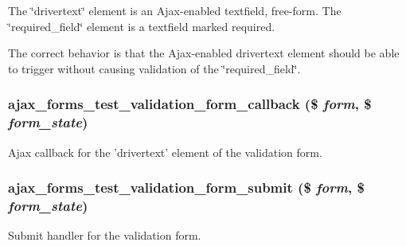The \char`\"{}drivertext\char`\"{} element is an Ajax-\/enabled textfield, free-\/form. The \char`\"{}required\_\-field\char`\"{} element is a textfield marked required.

The correct behavior is that the Ajax-\/enabled drivertext element should be able to trigger without causing validation of the \char`\"{}required\_\-field\char`\"{}. \hypertarget{ajax__forms__test_8module_a0f5790428359ee51c6949f4a93cb5387}{
\subsubsection[{ajax\_\-forms\_\-test\_\-validation\_\-form\_\-callback}]{\setlength{\rightskip}{0pt plus 5cm}ajax\_\-forms\_\-test\_\-validation\_\-form\_\-callback (\$ {\em form}, \/  \$ {\em form\_\-state})}}
\label{ajax__forms__test_8module_a0f5790428359ee51c6949f4a93cb5387}
Ajax callback for the 'drivertext' element of the validation form. \hypertarget{ajax__forms__test_8module_a85eb09134f35df5abd02870a263e0f32}{
\subsubsection[{ajax\_\-forms\_\-test\_\-validation\_\-form\_\-submit}]{\setlength{\rightskip}{0pt plus 5cm}ajax\_\-forms\_\-test\_\-validation\_\-form\_\-submit (\$ {\em form}, \/  \$ {\em form\_\-state})}}
\label{ajax__forms__test_8module_a85eb09134f35df5abd02870a263e0f32}
Submit handler for the validation form. 